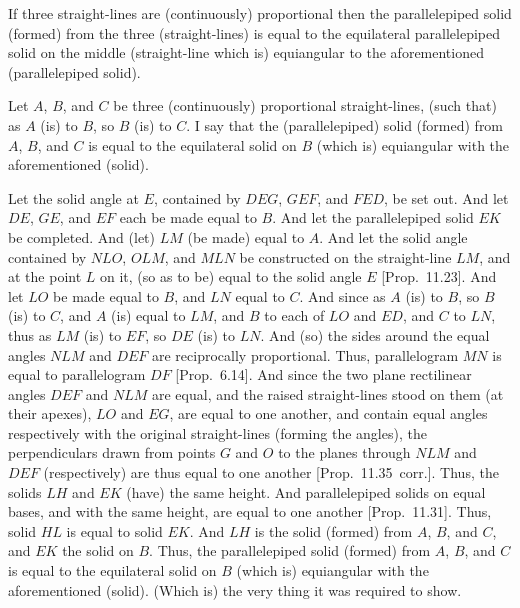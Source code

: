 \begin{Parallel}{}{}
{If three straight-lines are (continuously)
proportional then the parallelepiped solid (formed) from the three (straight-lines) is equal
to the equilateral parallelepiped solid on the middle (straight-line which is)
equiangular to the aforementioned (parallelepiped solid).

\epsfysize=1.8in
\centerline{}

Let $A$, $B$, and $C$ be three (continuously) proportional straight-lines,
(such that) as $A$ (is) to $B$, so $B$ (is) to $C$. I say that
the (parallelepiped) solid (formed) from $A$, $B$, and $C$ is
equal to the equilateral solid on $B$ (which is) equiangular with the
aforementioned (solid).

Let the solid angle at $E$, contained by $DEG$, $GEF$, and
$FED$, be set out. And let $DE$, $GE$, and $EF$ each be made equal
to $B$. And let the parallelepiped solid $EK$ be completed.
And (let) $LM$ (be made) equal to $A$. And let the solid angle
contained by $NLO$, $OLM$, and $MLN$ be constructed
on the straight-line $LM$, and at the point $L$ on it, (so as to be)
equal to the solid angle $E$ [Prop.~11.23]. 
And let $LO$ be made equal to $B$, and $LN$ equal  to $C$. And
since as $A$ (is) to $B$, so $B$ (is) to $C$, and $A$ (is) equal to
$LM$, and $B$ to each of $LO$ and $ED$, and $C$ to $LN$,
thus as $LM$ (is) to $EF$, so $DE$ (is) to $LN$. And (so) the sides
around the equal angles $NLM$ and $DEF$ are reciprocally
proportional. Thus, parallelogram $MN$ is equal to parallelogram
$DF$ [Prop.~6.14]. And since the
two plane rectilinear angles $DEF$ and $NLM$ are equal, and the raised straight-lines
stood on them (at their apexes), $LO$ and $EG$, are equal to one another,
and contain equal angles respectively with the original straight-lines (forming the angles),  the perpendiculars drawn from points $G$ and $O$
to the planes through $NLM$ and $DEF$ (respectively) are thus
equal to one another [Prop.~11.35~corr.]. 
Thus, the solids $LH$ and $EK$ (have) the same height. And
parallelepiped solids on equal bases, and with the same height, are
equal to one another [Prop.~11.31]. Thus,
solid $HL$ is equal to solid $EK$. And $LH$ is the solid (formed)
from $A$, $B$, and $C$, and $EK$ the solid on $B$. Thus,
the parallelepiped solid (formed) from $A$, $B$, and $C$ is equal
to the equilateral solid on $B$ (which is) equiangular with the
aforementioned (solid). (Which is) the very thing it was required to show.}
\end{Parallel}

